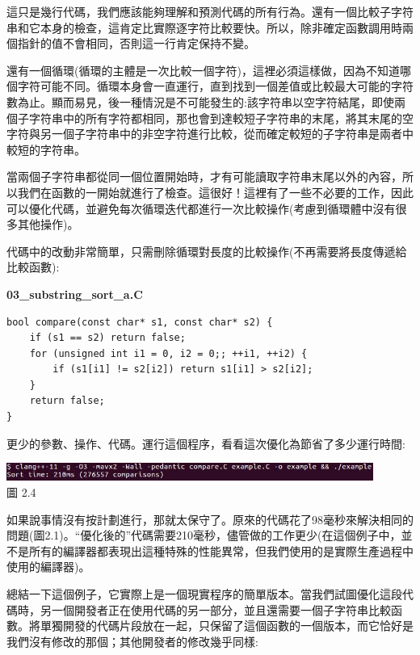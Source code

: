 這只是幾行代碼，我們應該能夠理解和預測代碼的所有行為。還有一個比較子字符串和它本身的檢查，這肯定比實際逐字符比較要快。所以，除非確定函數調用時兩個指針的值不會相同，否則這一行肯定保持不變。

還有一個循環(循環的主體是一次比較一個字符)，這裡必須這樣做，因為不知道哪個字符可能不同。循環本身會一直運行，直到找到一個差值或比較最大可能的字符數為止。顯而易見，後一種情況是不可能發生的:該字符串以空字符結尾，即使兩個子字符串中的所有字符都相同，那也會到達較短子字符串的末尾，將其末尾的空字符與另一個子字符串中的非空字符進行比較，從而確定較短的子字符串是兩者中較短的字符串。

當兩個子字符串都從同一個位置開始時，才有可能讀取字符串末尾以外的內容，所以我們在函數的一開始就進行了檢查。這很好！這裡有了一些不必要的工作，因此可以優化代碼，並避免每次循環迭代都進行一次比較操作(考慮到循環體中沒有很多其他操作)。

代碼中的改動非常簡單，只需刪除循環對長度的比較操作(不再需要將長度傳遞給比較函數):

\noindent
\textbf{03\_substring\_sort\_a.C}
\begin{lstlisting}[style=styleCXX]
bool compare(const char* s1, const char* s2) {
	if (s1 == s2) return false;
	for (unsigned int i1 = 0, i2 = 0;; ++i1, ++i2) {
		if (s1[i1] != s2[i2]) return s1[i1] > s2[i2];
	}
	return false;
}
\end{lstlisting}

更少的參數、操作、代碼。運行這個程序，看看這次優化為節省了多少運行時間:

\begin{center}
\includegraphics[width=0.9\textwidth]{content/1/chapter2/images/4.jpg}\\
圖 2.4
\end{center}

如果說事情沒有按計劃進行，那就太保守了。原來的代碼花了98毫秒來解決相同的問題(圖2.1)。“優化後的”代碼需要210毫秒，儘管做的工作更少(在這個例子中，並不是所有的編譯器都表現出這種特殊的性能異常，但我們使用的是實際生產過程中使用的編譯器)。

總結一下這個例子，它實際上是一個現實程序的簡單版本。當我們試圖優化這段代碼時，另一個開發者正在使用代碼的另一部分，並且還需要一個子字符串比較函數。將單獨開發的代碼片段放在一起，只保留了這個函數的一個版本，而它恰好是我們沒有修改的那個；其他開發者的修改幾乎同樣:


